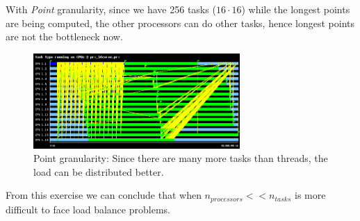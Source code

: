 \documentclass[a4paper,11pt]{article}
\newcommand{\figurespace}{\vspace{0.6cm}}
\begin{document}
\begin{enumerate}
  With \emph{Point} granularity, since we have 256 tasks ($16 \cdot 16$) while
  the longest points are being computed, the other processors can do other tasks,
  hence longest points are not the bottleneck now.

  \figurespace
\begin{figure}[h!]
\includegraphics[width=0.7\textwidth]{figures/point_16_cores.png}
\caption{Point granularity: Since there are many more tasks than threads, the load can be distributed better.}
\label{figure:load-point}
\end{figure}
  \figurespace
  From this exercise we can conclude that when $n_{processors} <<
  n_{tasks}$ is more difficult to face load balance problems.

\end{enumerate}
\clearpage
\end{document}
